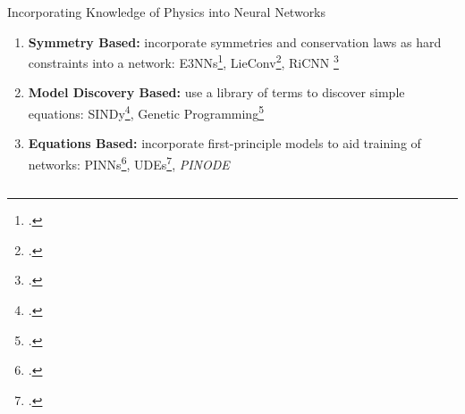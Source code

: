 \documentclass[8pt]{beamer}
\begin{document}
\begin{frame}{Incorporating Knowledge of Physics into Neural Networks}
\begin{enumerate}
	\item<2-> \textbf{Symmetry Based:} incorporate symmetries and conservation laws as hard constraints into a network: E3NNs\footcite{geiger2022e3nn}, LieConv\footcite{Finzi2020}, RiCNN \footcite{chidester2018rotation}
	\item<3-> \textbf{Model Discovery Based:} use a library of terms to discover simple equations: SINDy\footcite{champion2019data}, Genetic Programming\footcite{schmidt2009distilling}
	\item<4-> \textbf{Equations Based:} incorporate first-principle models to aid training of networks: PINNs\footcite{raissi2017physics}, UDEs\footcite{rackauckas2020udes}, \textit{PINODE}
\end{enumerate}

\begin{columns}[T,onlytextwidth]
\end{columns}

\end{frame}
\end{document}
